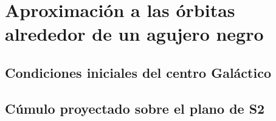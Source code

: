 \chapter{Aproximación a las órbitas alrededor de un agujero negro}
\setcounter{equation}{0}



\section{Condiciones iniciales del centro Galáctico}



\section{Cúmulo proyectado sobre el plano de S2}


